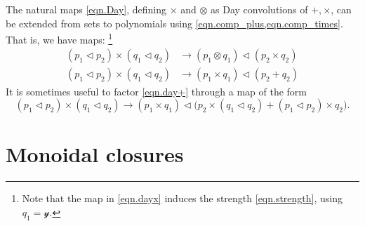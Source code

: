 \documentclass[11pt, one side, article]{memoir}
\newcommand{\myred}[1]{{\color{red!60!black}#1}}
\newcommand{\mygreen}[1]{{\color{green!40!black}#1}}
\theoremstyle{definition}
\theoremstyle{plain}
\newcommand{\Cat}[1]{\mathbf{#1}}%
\newcommand{\nn}{\mathbb{N}}
\newcommand{\yon}{{\mathcal{y}}}
\newcommand{\poly}{\Cat{Poly}}
\newcommand{\0}{\textsf{0}}
\newcommand{\1}{\tn{\textsf{1}}}
\newcommand{\tri}{\mathbin{\triangleleft}}
\begin{document}
The natural maps \eqref{eqn.Day}, defining $\times$ and $\otimes$ as Day convolutions of $+,\times$, can be extended from sets to polynomials using \cref{eqn.comp_plus,eqn.comp_times}. That is, we have maps:%
\footnote{Note that the map in \eqref{eqn.dayx} induces the strength \eqref{eqn.strength}, using $q_1=\yon$.}
\begin{align}
\label{eqn.dayx}
	(p_1\tri p_2)\times(q_1\tri q_2)&\to(p_1\otimes q_1)\tri(p_2\times q_2)\\
\label{eqn.day+}
	(p_1\tri p_2)\times(q_1\tri q_2)&\to(p_1\times q_1)\tri(p_2+q_2)
\end{align}
It is sometimes useful to factor \eqref{eqn.day+} through a map of the form
\begin{equation}
	(p_1\tri p_2)\times (q_1\tri q_2)\to (p_1\times q_1) \tri\Big(p_2\times(q_1\tri q_2)+(p_1\tri p_2)\times q_2\Big).
\end{equation}


\chapter{Monoidal closures}
\end{document}
